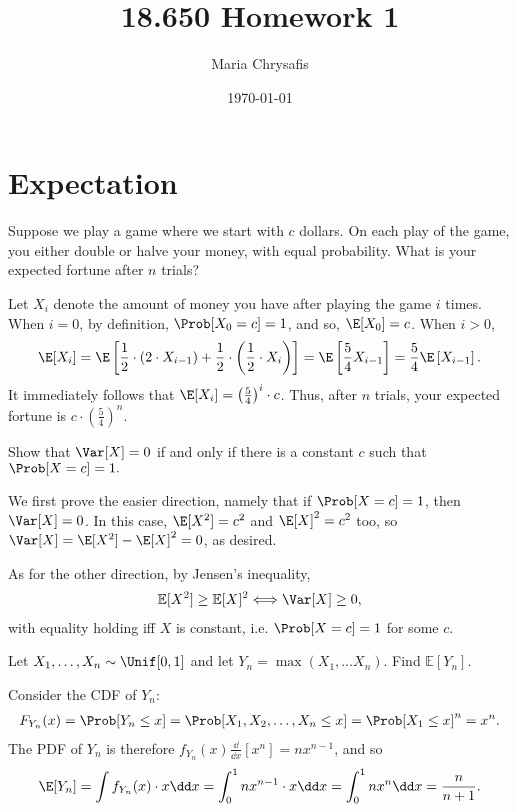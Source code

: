 \documentclass[a4paper]{article}
\author{Maria Chrysafis}
\date{\today}
\title{18.650 Homework 1}
\begin{document}
\maketitle
\section{Expectation}
\begin{Exercise}
	Suppose we play a game where we start with $c$ dollars. On each play of the game, you either double or halve your money, with equal probability. What is your expected fortune after $n$ trials?
\end{Exercise}
\begin{Solution}
	Let $X_i$ denote the amount of money you have after playing the game $i$ times. When $i = 0$, by definition, $\Prob[X_0 = c] = 1$, and so, $\E[X_0] = c$. When $i > 0$, 
	\begin{align*}
		\E[X_i] = \E \left[ \frac{1}{2} \cdot \left(2 \cdot X_{i - 1} \right) + \frac{1}{2} \cdot \left( \frac{1}{2} \cdot X_i \right) \right] = \E \left[\frac{5}{4} X_{i - 1} \right] = \frac{5}{4} \E \left[ X_{i - 1} \right].
	\end{align*}
	It immediately follows that $\E[X_i] = \left( \frac{5}{4} \right)^i \cdot c$. Thus, after $n$ trials, your expected fortune is $c \cdot \left( \frac{5}{4}\right)^n$.
\end{Solution}
\begin{Exercise}
	Show that $\Var[X] = 0$ if and only if there is a constant $c$ such that $\Prob[X = c]= 1.$
\end{Exercise}
\begin{Solution}
	We first prove the easier direction, namely that if $\Prob[X = c] = 1$, then $\Var[X] = 0$. In this case, $\E[X^2] = c^2$ and $\E[X]^2 = c^2$ too, so $\Var[X] = \E[X^2] - \E[X]^2 = 0$, as desired. 

	As for the other direction, by Jensen's inequality,
	\begin{align*}
		\mathbb{E}[X^2] \ge \mathbb{E}[X]^2 \Longleftrightarrow \Var[X] \ge 0,
	\end{align*}
	with equality holding iff $X$ is constant, i.e. $\Prob[X = c] = 1$ for some $c$. 
\end{Solution}
\begin{Exercise}
	Let $X_1, \ldots , X_n \sim \Unif[0, 1]$ and let $Y_n = \max \left( X_1, \ldots X_n \right)$. Find $\mathbb{E}[Y_n]$.
\end{Exercise}
\begin{Solution}
	Consider the CDF of $Y_n$:
	\begin{align*}
		F_{Y_n}(x) = \Prob[Y_n \le x] = \Prob [X_1, X_2, \ldots, X_n \le x] = \Prob [X_1 \le x]^n = x^n.
	\end{align*}
	The PDF of $Y_n$ is therefore $f_{Y_n}(x)\frac{\dd}{\dd x} \left[ x^n \right] = n x^{n - 1}$, and so
	\begin{align*}
		\E[Y_n] = \int f_{Y_n}(x) \cdot x \dd x = \int_0^{1} n x^{n - 1} \cdot x \dd x= \int_0^1 nx^n \dd x = \frac{n}{n + 1}.
	\end{align*}
\end{Solution}
\end{document}
